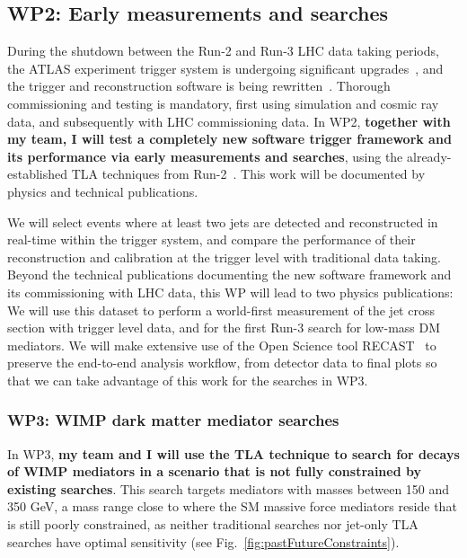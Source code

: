 \documentclass[11pt,a4paper]{article}
\begin{document}
\subsection*{WP2: Early measurements and searches}

During the shutdown between the Run-2 and Run-3 LHC data taking periods, the ATLAS experiment trigger system is undergoing significant upgrades~\cite{Aad:2013tqj}, and the trigger and reconstruction software is being rewritten~\cite{Stewart:2016pay}. 
Thorough commissioning and testing is mandatory, first using simulation and cosmic ray data, and subsequently with LHC commissioning data. 
In WP2, \textbf{together with my team, I will test a completely new software trigger framework and its performance via early measurements and searches}, using the already-established TLA techniques from Run-2~\cite{Aaboud:2018fzt}. This work will be documented by physics and technical publications.  

We will select events where at least two jets are detected and reconstructed in real-time within the trigger system, and compare the performance of their reconstruction and calibration at the trigger level with traditional data taking. 
Beyond the technical publications documenting the new software framework and its commissioning with LHC data, this WP will lead to two physics publications:  
We will use this dataset to perform a world-first measurement of the jet cross section with trigger level data, and for the first Run-3 search for low-mass DM mediators. 
We will make extensive use of the Open Science tool RECAST~\cite{Schuy:2019awp} to preserve the end-to-end analysis workflow, from detector data to final plots so that we can take advantage of this work for the searches in WP3.  

\subsubsection*{WP3: WIMP dark matter mediator searches}

In WP3, \textbf{my team and I will use the TLA technique to search for decays of WIMP mediators in a scenario that is not fully constrained by existing searches}.
This search targets mediators with masses between 150 and 350 GeV, a mass range close to where the SM massive force mediators reside that is still poorly constrained, as neither traditional searches nor jet-only TLA searches have optimal sensitivity (see Fig.~\ref{fig:pastFutureConstraints}).  
\end{document}
